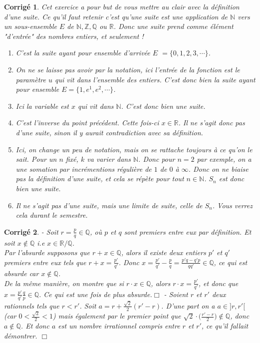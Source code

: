 \documentclass[11pt,french,table]{article}
\theoremstyle{exercice}
\theoremstyle{corrigé}
\newtheorem{corrigé}{Corrigé}
\begin{document}
\begin{corrigé}
 Cet exercice a pour but de vous mettre au clair avec la définition d'une suite. Ce qu'il faut retenir c'est qu'une suite  est une application de $\mathbb{N}$ vers un sous-ensemble $E$ de $\mathbb{N},\mathbb{Z},\mathbb{Q}$ ou $\mathbb{R}$. Donc une suite prend comme élément "d'entrée" des nombres entiers, et seulement ! 
 
\begin{enumerate}
    \item [(a)] C'est la suite ayant pour ensemble d'arrivée $E$  $=\{0,1,2,3,\cdots\}$.
    \item [(b)] On ne se laisse pas avoir par la notation, ici l'entrée de la fonction est le paramètre $u$ qui vit dans l'ensemble des entiers. C'est donc bien la suite ayant pour ensemble $E=\{1,e^1,e^2,\cdots\}$.
    \item [(c)] Ici la variable est $x$ qui vit dans $\mathbb{N}$. C'est donc bien une suite. 

     \item [(d)] C'est l'inverse du point précédent. Cette fois-ci $x\in \mathbb{R}$. Il ne s'agit donc pas d'une suite, sinon il y aurait contradiction avec sa définition. 
      \item [(e)] Ici, on change un peu de notation, mais on se rattache toujours à ce qu'on le sait. Pour un $n$ fixé, $k$ va varier dans $\mathbb{N}$. Donc pour $n=2$ par exemple, on a une somation par incrémentions régulière de $1$ de $0$ à $\infty$. Donc on ne biaise pas la définition d'une suite, et cela se répète pour tout $n\in \mathbb{N}$. $S_n$ est donc bien une suite. 
      \item [(f)] Il ne s'agit pas d'une suite, mais une limite de suite, celle de $S_n$. Vous verrez cela durant le semestre. 
\end{enumerate}
\end{corrigé}
\vspace{1em}
\begin{corrigé}
- Soit $r=\frac{p}{q}\in \mathbb{Q}$, où $p$ et $q$ sont premiers entre eux par définition. Et soit $x\notin\mathbb{Q}$ i.e $x\in \mathbb{R}/\mathbb{Q}$. \\
        Par l'absurde supposons que $r+x\in \mathbb{Q}$, alors il existe deux entiers $p'$ et $q'$ premiers entre eux tels que $r+x=\frac{p'}{q'}$. Donc $x=\frac{p'}{q'}-\frac{p}{q}=\frac{p'q-q'p}{qq'}\in \mathbb{Q}$, ce qui est absurde car $x\notin \mathbb{Q}$. \\
        De la même manière, on montre que si $r\cdot x\in \mathbb{Q}$, alors $r\cdot x=\frac{p'}{q'}$, et donc que $x=\frac{p'}{q'}\frac{q}{p}\in \mathbb{Q}$. Ce qui est une fois de plus absurde.\flushright $\Box$
\flushleft 
        - Soient $r$ et $r'$ deux rationnels tels que $r<r'$. Soit $a=r+\frac{\sqrt{2}}{2}(r'-r)$. D'une part on a $a\in ]r, r'[$ (car $0<\frac{\sqrt{2}}{2}<1$) mais également par le premier point que $\sqrt{2}\cdot \big (\frac{r'-r}{2} \big)\notin \mathbb{Q}$, donc $a\notin \mathbb{Q}$. Et donc $a$ est un nombre irrationnel compris entre $r$ et $r'$, ce qu'il fallait démontrer. \flushright $\Box$
\flushleft
\end{corrigé}
\end{document}

